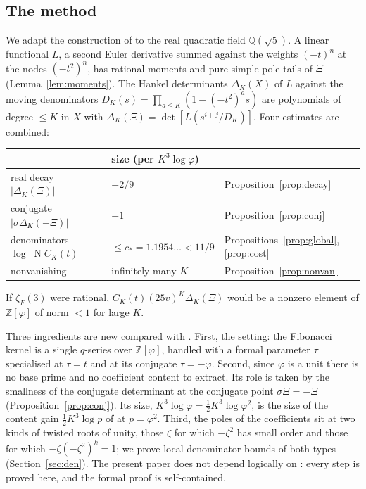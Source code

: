 \documentclass[11pt]{amsart}
\theoremstyle{definition}
\theoremstyle{remark}
\numberwithin{equation}{section}
\newcommand{\ZZ}{\mathbb{Z}}
\newcommand{\QQ}{\mathbb{Q}}
\newcommand{\Nm}{\operatorname{N}}
\begin{document}
\subsection*{The method}
We adapt the construction of \cite{UPL} to the real quadratic field $\QQ(\sqrt5)$. A linear functional $L$, a second
Euler derivative summed against the weights $(-t)^n$ at the nodes $(-t^2)^n$, has rational moments and pure simple-pole
tails of $\Xi$ (Lemma~\ref{lem:moments}). The Hankel determinants $\Delta_K(X)$ of $L$ against the moving denominators
$D_K(s)=\prod_{a\le K}(1-(-t^2)^as)$ are polynomials of degree $\le K$ in $X$ with $\Delta_K(\Xi)=\det[L(s^{i+j}/D_K)]$.
Four estimates are combined:
\begin{center}
\small
\begin{tabular}{lll}
\toprule
 & size (per $K^3\log\varphi$) & \\
\midrule
real decay $|\Delta_K(\Xi)|$ & $-2/9$ & Proposition~\ref{prop:decay}\\
conjugate $|\sigma\Delta_K(-\Xi)|$ & $-1$ & Proposition~\ref{prop:conj}\\
denominators $\log|\Nm C_K(t)|$ & $\le c_*=1.1954\ldots<11/9$ & Propositions~\ref{prop:global}, \ref{prop:cost}\\
nonvanishing & infinitely many $K$ & Proposition~\ref{prop:nonvan}\\
\bottomrule
\end{tabular}
\end{center}
If $\zeta_F(3)$ were rational, $C_K(t)(25v)^K\Delta_K(\Xi)$ would be a nonzero element of $\ZZ[\varphi]$ of norm
$<1$ for large $K$.

Three ingredients are new compared with \cite{UPL}. First, the setting: the Fibonacci kernel is a single $q$-series over
$\ZZ[\varphi]$, handled with a formal parameter $\tau$ specialised at $\tau=t$ and at its conjugate $\tau=-\varphi$. Second,
since $\varphi$ is a unit there is no base prime and no coefficient content to extract. Its role is taken by the
smallness of the conjugate determinant at the conjugate point $\sigma\Xi=-\Xi$ (Proposition~\ref{prop:conj}). Its size,
$K^3\log\varphi=\tfrac12K^3\log\varphi^2$, is the size of the content gain $\tfrac12K^3\log p$ of \cite{UPL} at
$p=\varphi^2$. Third, the poles of the coefficients sit at two kinds of twisted roots of unity, those $\zeta$ for which
$-\zeta^2$ has small order and those for which $-\zeta(-\zeta^2)^k=1$; we prove local denominator bounds of both types
(Section~\ref{sec:den}). The present paper does not depend logically on \cite{UPL}: every step is proved here, and the
formal proof is self-contained.
\end{document}

